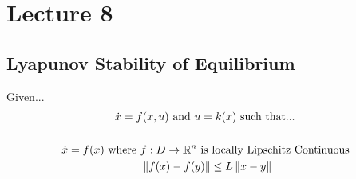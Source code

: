 \section*{Lecture 8}

\subsection*{Lyapunov Stability of Equilibrium}

Given...
\begin{gather*}
  \dot{x} = f(x, u) \text{ and } u = k(x) \text{ such that... } \\
  \\
  \dot{x} = f(x) \text{ where } f:D \rightarrow \mathbb{R}^n \text{ is locally Lipschitz Continuous } \\
  \left\Vert f(x) - f(y) \right\Vert \leq L \left\Vert x - y \right\Vert
\end{gather*}


\
